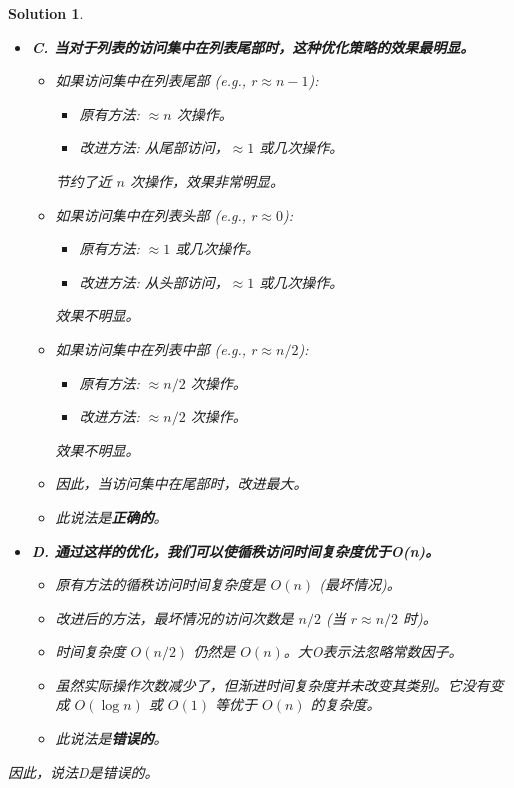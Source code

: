 \documentclass[UTF8]{report}
\newtheorem{solution}{Solution}
\theoremstyle{MyLineTheoremStyle} %
\theoremstyle{MyBlockTheoremStyle} %
\theoremstyle{MySubsubsectionStyle} %
\begin{document}
\begin{solution}
\begin{itemize}
    \item \textbf{C. 当对于列表的访问集中在列表尾部时，这种优化策略的效果最明显。}
    \begin{itemize}
        \item 如果访问集中在列表尾部 (e.g., $r \approx n-1$):
        \begin{itemize}
            \item 原有方法: $\approx n$ 次操作。
            \item 改进方法: 从尾部访问，$\approx 1$ 或几次操作。
        \end{itemize}
        节约了近 $n$ 次操作，效果非常明显。
        \item 如果访问集中在列表头部 (e.g., $r \approx 0$):
        \begin{itemize}
            \item 原有方法: $\approx 1$ 或几次操作。
            \item 改进方法: 从头部访问，$\approx 1$ 或几次操作。
        \end{itemize}
        效果不明显。
        \item 如果访问集中在列表中部 (e.g., $r \approx n/2$):
        \begin{itemize}
            \item 原有方法: $\approx n/2$ 次操作。
            \item 改进方法: $\approx n/2$ 次操作。
        \end{itemize}
        效果不明显。
        \item 因此，当访问集中在尾部时，改进最大。
        \item 此说法是\textbf{正确的}。
    \end{itemize}

    \item \textbf{D. 通过这样的优化，我们可以使循秩访问时间复杂度优于O(n)。}
    \begin{itemize}
        \item 原有方法的循秩访问时间复杂度是 $O(n)$ (最坏情况)。
        \item 改进后的方法，最坏情况的访问次数是 $n/2$ (当 $r \approx n/2$ 时)。
        \item 时间复杂度 $O(n/2)$ 仍然是 $O(n)$。大O表示法忽略常数因子。
        \item 虽然实际操作次数减少了，但渐进时间复杂度并未改变其类别。它没有变成 $O(\log n)$ 或 $O(1)$ 等优于 $O(n)$ 的复杂度。
        \item 此说法是\textbf{错误的}。
    \end{itemize}
\end{itemize}
因此，说法D是错误的。
\end{solution}
\end{document}
